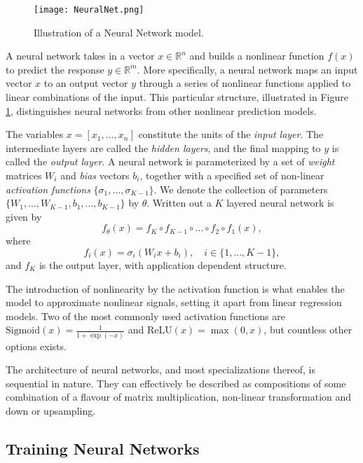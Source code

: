 \documentclass[../../thesis.tex]{subfiles}
\begin{document}
\begin{figure}
    \texttt{[image: NeuralNet.png]}
    \centering 
    \caption{Illustration of a Neural Network model.}
    \label{fig:NeuralNet}
\end{figure}

A neural network takes in a vector $x \in \mathbb{R}^n$ and builds a nonlinear function $f(x)$ to predict the response $y\in \mathbb{R}^m$. More specifically, a neural network maps an input vector $x$ to an output vector $y$ through a series of nonlinear functions applied to linear combinations of the input. This particular structure, illustrated in Figure \ref{fig:NeuralNet}, distinguishes neural networks from other nonlinear prediction models. \newline

The variables $x = [x_1,...,x_n]$ constitute the units of the \textit{input layer}. The intermediate layers are called the \textit{hidden layers}, and the final mapping to $y$ is called the \textit{output layer}. A neural network is parameterized by a set of \textit{weight} matrices $W_i$ and \textit{bias} vectors $b_i$, together with a specified set of non-linear \textit{activation functions} $\{\sigma_1,\dots,\sigma_{K-1}\}$. We denote the collection of parameters $\{W_1,...,W_{K-1}, b_1,...,b_{K-1}\}$ by $\theta$. Written out a $K$ layered neural network is given by 
\[ 
f_\theta(x) = f_K \circ f_{K-1} \circ \ldots \circ f_2 \circ f_1(x),
\]
where 
$$f_i(x) = \sigma_i(W_ix+b_i), \quad i \in \{1,...,K-1\},$$ 
and $f_K$ is the output layer, with application dependent structure.\newline

The introduction of nonlinearity by the activation function is what enables the model to approximate nonlinear signals, setting it apart from linear regression models. Two of the most commonly used activation functions are $\text{Sigmoid}(x) = \tfrac{1}{1+\exp(-x)}$ and $\text{ReLU}(x) = \max(0,x)$, but countless other options exists.\newline

The architecture of neural networks, and most specializations thereof, is sequential in nature. They can effectively be described as compositions of some combination of a flavour of matrix multiplication, non-linear transformation and down or upsampling. 

\subsection{Training Neural Networks}
\end{document}
